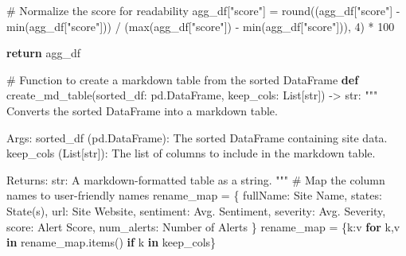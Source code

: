 \documentclass[
  letterpaper,
  DIV=11,
  numbers=noendperiod]{scrartcl}
\newenvironment{Shaded}{\begin{snugshade}}{\end{snugshade}}
\newcommand{\BuiltInTok}[1]{\textcolor[rgb]{0.00,0.23,0.31}{#1}}
\newcommand{\CommentTok}[1]{\textcolor[rgb]{0.37,0.37,0.37}{#1}}
\newcommand{\ControlFlowTok}[1]{\textcolor[rgb]{0.00,0.23,0.31}{\textbf{#1}}}
\newcommand{\DecValTok}[1]{\textcolor[rgb]{0.68,0.00,0.00}{#1}}
\newcommand{\KeywordTok}[1]{\textcolor[rgb]{0.00,0.23,0.31}{\textbf{#1}}}
\newcommand{\NormalTok}[1]{\textcolor[rgb]{0.00,0.23,0.31}{#1}}
\newcommand{\OperatorTok}[1]{\textcolor[rgb]{0.37,0.37,0.37}{#1}}
\newcommand{\StringTok}[1]{\textcolor[rgb]{0.13,0.47,0.30}{#1}}
\begin{document}
\begin{Shaded}
\begin{Highlighting}[]
    \CommentTok{\# Normalize the score for readability}
\NormalTok{    agg\_df[}\StringTok{"score"}\NormalTok{] }\OperatorTok{=} \BuiltInTok{round}\NormalTok{((agg\_df[}\StringTok{"score"}\NormalTok{] }\OperatorTok{{-}} \BuiltInTok{min}\NormalTok{(agg\_df[}\StringTok{"score"}\NormalTok{])) }\OperatorTok{/}\NormalTok{ (}\BuiltInTok{max}\NormalTok{(agg\_df[}\StringTok{"score"}\NormalTok{]) }\OperatorTok{{-}} \BuiltInTok{min}\NormalTok{(agg\_df[}\StringTok{"score"}\NormalTok{])), }\DecValTok{4}\NormalTok{) }\OperatorTok{*} \DecValTok{100}

    \ControlFlowTok{return}\NormalTok{ agg\_df}

\CommentTok{\# Function to create a markdown table from the sorted DataFrame}
\KeywordTok{def}\NormalTok{ create\_md\_table(sorted\_df: pd.DataFrame, keep\_cols: List[}\BuiltInTok{str}\NormalTok{]) }\OperatorTok{{-}\textgreater{}} \BuiltInTok{str}\NormalTok{:}
    \CommentTok{"""}
\CommentTok{    Converts the sorted DataFrame into a markdown table.}

\CommentTok{    Args:}
\CommentTok{        sorted\_df (pd.DataFrame): The sorted DataFrame containing site data.}
\CommentTok{        keep\_cols (List[str]): The list of columns to include in the markdown table.}

\CommentTok{    Returns:}
\CommentTok{        str: A markdown{-}formatted table as a string.}
\CommentTok{    """}
    \CommentTok{\# Map the column names to user{-}friendly names}
\NormalTok{    rename\_map }\OperatorTok{=}\NormalTok{ \{}
        \StringTok{\textquotesingle{}fullName\textquotesingle{}}\NormalTok{: }\StringTok{\textquotesingle{}Site Name\textquotesingle{}}\NormalTok{,}
        \StringTok{\textquotesingle{}states\textquotesingle{}}\NormalTok{: }\StringTok{\textquotesingle{}State(s)\textquotesingle{}}\NormalTok{,}
        \StringTok{\textquotesingle{}url\textquotesingle{}}\NormalTok{: }\StringTok{\textquotesingle{}Site Website\textquotesingle{}}\NormalTok{,}
        \StringTok{\textquotesingle{}sentiment\textquotesingle{}}\NormalTok{: }\StringTok{\textquotesingle{}Avg. Sentiment\textquotesingle{}}\NormalTok{,}
        \StringTok{\textquotesingle{}severity\textquotesingle{}}\NormalTok{: }\StringTok{\textquotesingle{}Avg. Severity\textquotesingle{}}\NormalTok{,}
        \StringTok{\textquotesingle{}score\textquotesingle{}}\NormalTok{: }\StringTok{\textquotesingle{}Alert Score\textquotesingle{}}\NormalTok{,}
        \StringTok{\textquotesingle{}num\_alerts\textquotesingle{}}\NormalTok{: }\StringTok{\textquotesingle{}Number of Alerts\textquotesingle{}}
\NormalTok{    \}}
\NormalTok{    rename\_map }\OperatorTok{=}\NormalTok{ \{k:v }\ControlFlowTok{for}\NormalTok{ k,v }\KeywordTok{in}\NormalTok{ rename\_map.items() }\ControlFlowTok{if}\NormalTok{ k }\KeywordTok{in}\NormalTok{ keep\_cols\}}


\end{Highlighting}
\end{Shaded}
\end{document}

